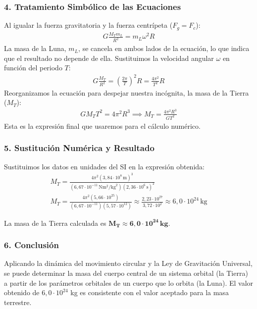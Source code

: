 \subsubsection*{4. Tratamiento Simbólico de las Ecuaciones}
Al igualar la fuerza gravitatoria y la fuerza centrípeta ($F_g = F_c$):
\begin{gather}
    G \frac{M_T m_L}{R^2} = m_L \omega^2 R
\end{gather}
La masa de la Luna, $m_L$, se cancela en ambos lados de la ecuación, lo que indica que el resultado no depende de ella. Sustituimos la velocidad angular $\omega$ en función del periodo $T$:
\begin{gather}
    G \frac{M_T}{R^2} = \left(\frac{2\pi}{T}\right)^2 R = \frac{4\pi^2}{T^2} R
\end{gather}
Reorganizamos la ecuación para despejar nuestra incógnita, la masa de la Tierra ($M_T$):
\begin{gather}
    G M_T T^2 = 4\pi^2 R^3 \implies M_T = \frac{4\pi^2 R^3}{G T^2}
\end{gather}
Esta es la expresión final que usaremos para el cálculo numérico.

\subsubsection*{5. Sustitución Numérica y Resultado}
Sustituimos los datos en unidades del SI en la expresión obtenida:
\begin{gather}
    M_T = \frac{4\pi^2 (3,84 \cdot 10^8 \, \text{m})^3}{(6,67 \cdot 10^{-11} \, \text{N}\text{m}^2/\text{kg}^2) (2,36 \cdot 10^6 \, \text{s})^2} \nonumber \\
    M_T = \frac{4\pi^2 (5,66 \cdot 10^{25})}{(6,67 \cdot 10^{-11})(5,57 \cdot 10^{12})} \approx \frac{2,23 \cdot 10^{27}}{3,72 \cdot 10^2} \approx 6,0 \cdot 10^{24} \, \text{kg}
\end{gather}
\begin{cajaresultado}
    La masa de la Tierra calculada es $\boldsymbol{M_T \approx 6,0 \cdot 10^{24} \, \textbf{kg}}$.
\end{cajaresultado}

\subsubsection*{6. Conclusión}
\begin{cajaconclusion}
Aplicando la dinámica del movimiento circular y la Ley de Gravitación Universal, se puede determinar la masa del cuerpo central de un sistema orbital (la Tierra) a partir de los parámetros orbitales de un cuerpo que lo orbita (la Luna). El valor obtenido de $6,0 \cdot 10^{24}$ kg es consistente con el valor aceptado para la masa terrestre.
\end{cajaconclusion}

